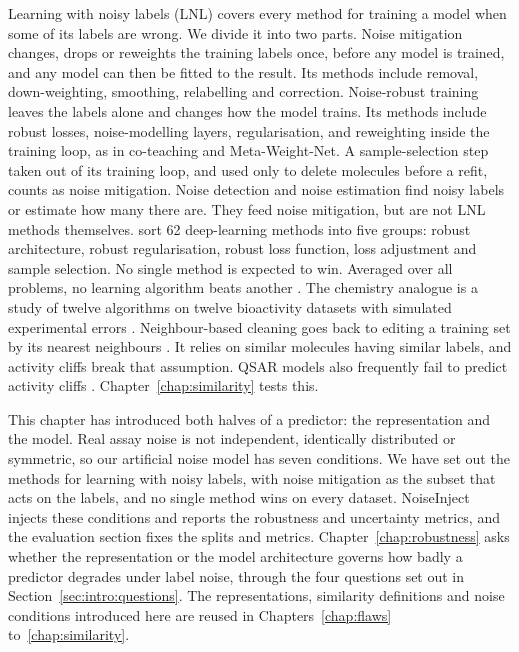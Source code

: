 Learning with noisy labels (LNL) covers every method for training a model when some of its labels are wrong. We divide it into two parts. Noise mitigation changes, drops or reweights the training labels once, before any model is trained, and any model can then be fitted to the result. Its methods include removal, down-weighting, smoothing, relabelling and correction. Noise-robust training leaves the labels alone and changes how the model trains. Its methods include robust losses, noise-modelling layers, regularisation, and reweighting inside the training loop, as in co-teaching and Meta-Weight-Net. A sample-selection step taken out of its training loop, and used only to delete molecules before a refit, counts as noise mitigation. Noise detection and noise estimation find noisy labels or estimate how many there are. They feed noise mitigation, but are not LNL methods themselves. \citet{Song2022} sort 62 deep-learning methods into five groups: robust architecture, robust regularisation, robust loss function, loss adjustment and sample selection.
No single method is expected to win. Averaged over all problems, no learning algorithm beats another \citep{Wolpert1996, Wolpert1997}. The chemistry analogue is a study of twelve algorithms on twelve bioactivity datasets with simulated experimental errors \citep{Cortes2015}. Neighbour-based cleaning goes back to editing a training set by its nearest neighbours \citep{Wilson1972}. It relies on similar molecules having similar labels, and activity cliffs break that assumption. QSAR models also frequently fail to predict activity cliffs \citep{Dablander2023}. Chapter~\ref{chap:similarity} tests this.

This chapter has introduced both halves of a predictor: the representation and the model. Real assay noise is not independent, identically distributed or symmetric, so our artificial noise model has seven conditions. We have set out the methods for learning with noisy labels, with noise mitigation as the subset that acts on the labels, and no single method wins on every dataset. NoiseInject injects these conditions and reports the robustness and uncertainty metrics, and the evaluation section fixes the splits and metrics. Chapter~\ref{chap:robustness} asks whether the representation or the model architecture governs how badly a predictor degrades under label noise, through the four questions set out in Section~\ref{sec:intro:questions}. The representations, similarity definitions and noise conditions introduced here are reused in Chapters~\ref{chap:flaws} to~\ref{chap:similarity}.
